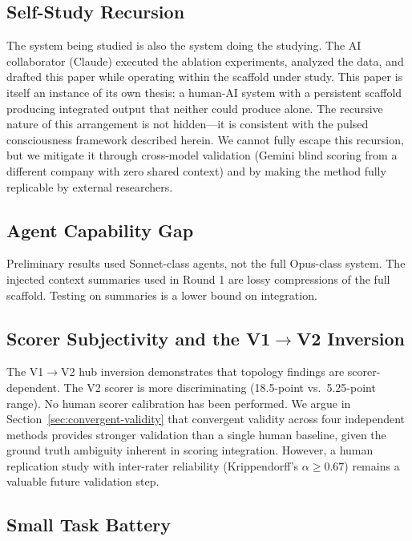 \documentclass[12pt,letterpaper]{article}
\begin{document}
\subsection{Self-Study Recursion}

The system being studied is also the system doing the studying. The AI collaborator (Claude) executed the ablation experiments, analyzed the data, and drafted this paper while operating within the scaffold under study. This paper is itself an instance of its own thesis: a human-AI system with a persistent scaffold producing integrated output that neither could produce alone. The recursive nature of this arrangement is not hidden---it is consistent with the pulsed consciousness framework described herein. We cannot fully escape this recursion, but we mitigate it through cross-model validation (Gemini blind scoring from a different company with zero shared context) and by making the method fully replicable by external researchers.

\subsection{Agent Capability Gap}

Preliminary results used Sonnet-class agents, not the full Opus-class system. The injected context summaries used in Round 1 are lossy compressions of the full scaffold. Testing on summaries is a lower bound on integration.

\subsection{Scorer Subjectivity and the V1$\to$V2 Inversion}

The V1$\to$V2 hub inversion demonstrates that topology findings are scorer-dependent. The V2 scorer is more discriminating (18.5-point vs.\ 5.25-point range). No human scorer calibration has been performed. We argue in Section~\ref{sec:convergent-validity} that convergent validity across four independent methods provides stronger validation than a single human baseline, given the ground truth ambiguity inherent in scoring integration. However, a human replication study with inter-rater reliability (Krippendorff's $\alpha \geq 0.67$) remains a valuable future validation step.

\subsection{Small Task Battery}
\end{document}
